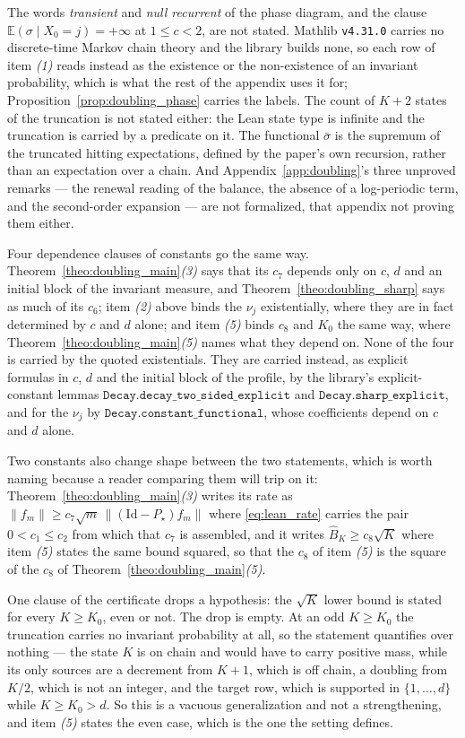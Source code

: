 The words \emph{transient} and \emph{null recurrent} of the phase diagram, and the clause
$\mathbb E(\sigma\mid X_0=j)=+\infty$ at $1\leq c<2$, are not stated. Mathlib \texttt{v4.31.0}
carries no discrete-time Markov chain theory and the library builds none, so each row of item
\emph{(1)} reads instead as the existence or the non-existence of an invariant probability,
which is what the rest of the appendix uses it for; Proposition~\ref{prop:doubling_phase}
carries the labels. The count of $K+2$ states of the truncation is not stated either: the Lean
state type is infinite and the truncation is carried by a predicate on it. The functional
$\bar\sigma$ is the supremum of the truncated hitting expectations, defined by the paper's own
recursion, rather than an expectation over a chain. And Appendix~\ref{app:doubling}'s three
unproved remarks --- the renewal reading of the balance, the absence of a log-periodic term,
and the second-order expansion --- are not formalized, that appendix not proving them either.

Four dependence clauses of constants go the same way. Theorem~\ref{theo:doubling_main}\emph{(3)}
says that its $c_7$ depends only on $c$, $d$ and an initial block of the invariant measure, and
Theorem~\ref{theo:doubling_sharp} says as much of its $c_6$; item \emph{(2)} above binds the
$\nu_j$ existentially, where they are in fact determined by $c$ and $d$ alone; and item
\emph{(5)} binds $c_8$ and $K_0$ the same way, where
Theorem~\ref{theo:doubling_main}\emph{(5)} names what they depend on. None of the four is
carried by the quoted existentials. They are carried instead, as explicit
formulas in $c$, $d$ and the initial block of the profile, by the library's explicit-constant
lemmas $\texttt{Decay.decay\_two\_sided\_explicit}$ and $\texttt{Decay.sharp\_explicit}$, and
for the $\nu_j$ by $\texttt{Decay.constant\_functional}$, whose coefficients depend on $c$ and
$d$ alone.

Two constants also change shape between the two statements, which is worth naming because a
reader comparing them will trip on it: Theorem~\ref{theo:doubling_main}\emph{(3)} writes its
rate as $\|f_m\|\geq c_7\sqrt m\,\|(\mathrm{Id}-P_\star)f_m\|$ where \eqref{eq:lean_rate}
carries the pair $0<c_1\leq c_2$ from which that $c_7$ is assembled, and it writes
$\widehat B_K\geq c_8\sqrt K$ where item \emph{(5)} states the same bound squared, so that the
$c_8$ of item \emph{(5)} is the square of the $c_8$ of
Theorem~\ref{theo:doubling_main}\emph{(5)}.

One clause of the certificate drops a hypothesis: the $\sqrt K$ lower bound is stated for every
$K\geq K_0$, even or not. The drop is empty. At an odd $K\geq K_0$ the truncation carries no
invariant probability at all, so the statement quantifies over nothing --- the state $K$ is on
chain and would have to carry positive mass, while its only sources are a decrement from $K+1$,
which is off chain, a doubling from $K/2$, which is not an integer, and the target row, which is
supported in $\{1,\dots,d\}$ while $K\geq K_0>d$. So this is a vacuous generalization and not a
strengthening, and item \emph{(5)} states the even case, which is the one the setting defines.

